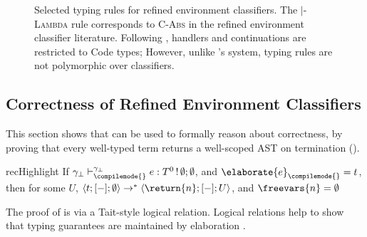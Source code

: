 \begin{figure}
\begin{rec-desc}
\begin{center}
\end{center}
\end{rec-desc}

\caption{Selected typing rules for refined environment classifiers. The \compilemode{}$\mid$\quotemode{}-\textsc{Lambda} rule corresponds to \textsc{C-Abs} in the refined environment classifier literature. Following \citeauthor{isoda-24}, handlers and continuations are restricted to \textsf{Code} types; However, unlike \citeauthor{isoda-24}'s system, typing rules are not polymorphic over classifiers.}
\label{fig:refined-env-classifiers-source-typing-rules}
\end{figure}

\subsection{Correctness of Refined Environment Classifiers}\label{subsection:rec-formal-correctness}
This section shows that \recLang{} can be used to formally reason about correctness, by proving that every well-typed \recLang{} term returns a well-scoped AST on termination (). 

\begin{theorem}{recHighlight}\label{thm:refined-env-classifiers-correct}
If $\gamma_\bot \vdash ^{\gamma_\bot}_{\compilemode{}} e: T^0 \, ! \, \emptyset ; \emptyset $, and $\elaborate{e}_{\compilemode{}} = t$, \\
\noindent{}then for some $U$, $\langle t;[-]; \emptyset \rangle \to^{*} \langle \return{n}; [-] ; U \rangle$, and $\freevars{n} = \emptyset$
\end{theorem}

The proof of  is via a Tait-style logical relation. Logical relations help to show that typing guarantees are maintained by elaboration \citep{benton-09}.

